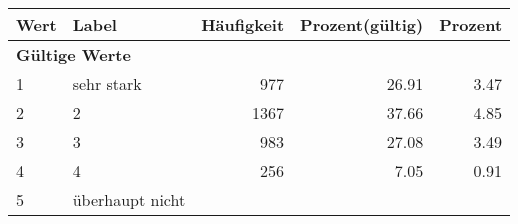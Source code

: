      \begin{longtable}{lXrrr}
     \toprule
     \textbf{Wert} & \textbf{Label} & \textbf{Häufigkeit} & \textbf{Prozent(gültig)} & \textbf{Prozent} \\
     \endhead
     \midrule
     \multicolumn{5}{l}{\textbf{Gültige Werte}}\\

     1 &
     \multicolumn{1}{X}{ sehr stark   } &


       \num{977} &
       \num[round-mode=places,round-precision=2]{26.91} &
         \num[round-mode=places,round-precision=2]{3.47} \\

     2 &
     \multicolumn{1}{X}{ 2   } &


       \num{1367} &
       \num[round-mode=places,round-precision=2]{37.66} &
         \num[round-mode=places,round-precision=2]{4.85} \\

     3 &
     \multicolumn{1}{X}{ 3   } &


       \num{983} &
       \num[round-mode=places,round-precision=2]{27.08} &
         \num[round-mode=places,round-precision=2]{3.49} \\

     4 &
     \multicolumn{1}{X}{ 4   } &


       \num{256} &
       \num[round-mode=places,round-precision=2]{7.05} &
         \num[round-mode=places,round-precision=2]{0.91} \\

     5 &
     \multicolumn{1}{X}{ überhaupt nicht   } &



\end{longtable}

